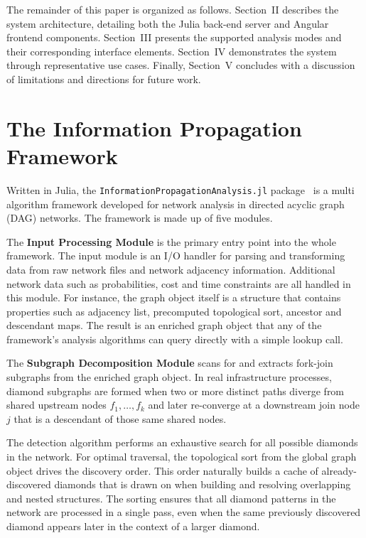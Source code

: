 \documentclass[twocolumn]{rps-esrel2026}
\begin{document}
The  remainder of this paper is organized as follows. Section~II describes the system architecture, detailing both the Julia back-end server and Angular frontend components. Section~III presents the supported analysis modes and their corresponding interface elements. Section~IV demonstrates the system through representative use cases. Finally, Section~V concludes with a discussion of limitations and directions for future work.

\section{The Information Propagation Framework}
Written in Julia, the \texttt{InformationPropagationAnalysis.jl} package~\cite{infoprop2026_julia} is a multi algorithm framework developed for network analysis in directed acyclic graph (DAG) networks. The framework is made up of five modules. 

The \textbf{Input Processing Module} is the primary entry point into the whole framework. The input module is an I/O handler for parsing and transforming data from raw network files and network adjacency information. Additional network data such as probabilities, cost and time constraints are all handled in this module. For instance, the graph object itself is a structure that contains properties such as adjacency list, precomputed topological sort, ancestor and descendant maps. The result is an enriched graph object that any of the framework's analysis algorithms can query directly with a simple lookup call.

The \textbf{Subgraph Decomposition Module} scans for and extracts fork-join subgraphs from the enriched graph object. In real infrastructure processes, diamond subgraphs are formed when two or more distinct paths diverge from shared upstream nodes $f_1, \ldots, f_k$ and later re-converge at a downstream join node $j$ that is a descendant of those same shared nodes.

The detection algorithm performs an exhaustive search for all possible diamonds in the network. For optimal traversal, the topological sort from the global graph object drives the discovery order. This order naturally builds a cache of already-discovered diamonds that is drawn on when building and resolving overlapping and nested structures. The sorting ensures that all diamond patterns in the network are processed in a single pass, even when the same previously discovered diamond appears later in the context of a larger diamond.
\end{document}
